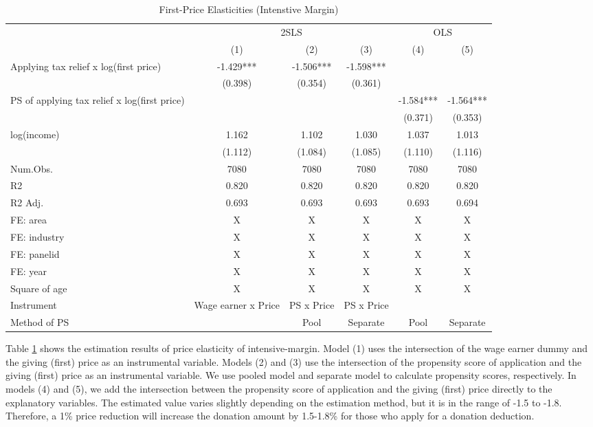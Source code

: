 \documentclass[
  11pt,
  a4paper,
]{article}
\begin{document}
\begin{table}

\caption{\label{tab:intensive}First-Price Elasticities (Intenstive Margin)}
\centering
\begin{tabular}[t]{lccccc}
\toprule
\multicolumn{1}{c}{ } & \multicolumn{3}{c}{2SLS} & \multicolumn{2}{c}{OLS} \\
\cmidrule(l{3pt}r{3pt}){2-4} \cmidrule(l{3pt}r{3pt}){5-6}
  & (1) & (2) & (3) & (4) & (5)\\
\midrule
Applying tax relief x log(first price) & -1.429*** & -1.506*** & -1.598*** &  & \\
 & (0.398) & (0.354) & (0.361) &  & \\
PS of applying tax relief x log(first price) &  &  &  & -1.584*** & -1.564***\\
 &  &  &  & (0.371) & (0.353)\\
log(income) & 1.162 & 1.102 & 1.030 & 1.037 & 1.013\\
 & (1.112) & (1.084) & (1.085) & (1.110) & (1.116)\\
\midrule
Num.Obs. & 7080 & 7080 & 7080 & 7080 & 7080\\
R2 & 0.820 & 0.820 & 0.820 & 0.820 & 0.820\\
R2 Adj. & 0.693 & 0.693 & 0.693 & 0.693 & 0.694\\
FE: area & X & X & X & X & X\\
FE: industry & X & X & X & X & X\\
FE: panelid & X & X & X & X & X\\
FE: year & X & X & X & X & X\\
Square of age & X & X & X & X & X\\
Instrument & Wage earner x Price & PS x Price & PS x Price &  & \\
Method of PS &  & Pool & Separate & Pool & Separate\\
\bottomrule
\end{tabular}
\end{table}

Table \ref{tab:intensive} shows
the estimation results of price elasticity of intensive-margin.
Model (1) uses the intersection of the wage earner dummy and
the giving (first) price as an instrumental variable.
Models (2) and (3) use
the intersection of the propensity score of application and
the giving (first) price as an instrumental variable.
We use pooled model and separate model to calculate propensity scores,
respectively.
In models (4) and (5), we add the intersection between
the propensity score of application and the giving (first) price
directly to the explanatory variables.
The estimated value varies slightly depending on the estimation method,
but it is in the range of -1.5 to -1.8.
Therefore, a 1\% price reduction will increase the donation amount by 1.5-1.8\%
for those who apply for a donation deduction.
\end{document}
